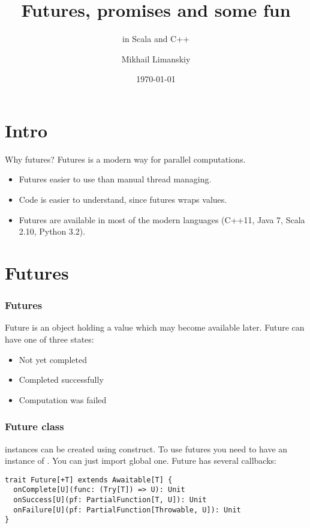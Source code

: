\documentclass{beamer}
\title{Futures, promises and some fun}
\subtitle{in Scala and C++}
\author{Mikhail Limanskiy}
\institute{SymphonyTeleca}
\date{\today}
\begin{document}
\begin{frame}
    \titlepage
\end{frame}

\section {Intro}

\begin{frame}{Why futures?}
Futures is a modern way for parallel computations.
\begin{itemize}
\item Futures easier to use than manual thread managing.
\item Code is easier to understand, since futures wraps values.
\item Futures are available in most of the modern languages (C++11, Java 7, Scala 2.10, Python 3.2).
\end{itemize}
\end{frame}

\section{Futures}

\begin{frame}
\frametitle{Futures}
Future is an object holding a value which may become available later.  Future can have one of three states:
\begin{itemize}
\item Not yet completed
\item Completed successfully
\item Computation was failed
\end{itemize}
\end{frame}

\begin{frame}[fragile]
\frametitle{Future class}
 instances can be created using  construct.
To use futures you need to have an instance of . You can just import global one.
Future has several callbacks:
\begin{lstlisting}
trait Future[+T] extends Awaitable[T] {
  onComplete[U](func: (Try[T]) => U): Unit
  onSuccess[U](pf: PartialFunction[T, U]): Unit
  onFailure[U](pf: PartialFunction[Throwable, U]): Unit
}
\end{lstlisting}
\end{frame}
\end{document}
